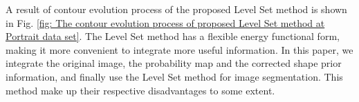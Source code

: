 A result of contour evolution process of the proposed Level Set method is shown in Fig. \ref{fig: The contour evolution process of proposed Level Set method at Portrait data set}. The Level Set method has a flexible energy functional form, making it more convenient to integrate more useful information. In this paper, we integrate the original image, the probability map and the corrected shape prior information, and finally use the Level Set method for image segmentation. This method make up their respective disadvantages to some extent.
